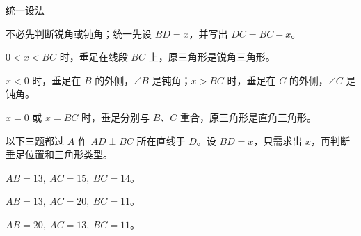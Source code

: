 \documentclass{exam-zh}
\begin{document}
\begin{eduSummaryBlock}{\eduIconPin}{统一设法}
\begin{eduBulletList}
  \item 不必先判断锐角或钝角；统一先设 $BD=x$，并写出 $DC=BC-x$。
  \item $0<x<BC$ 时，垂足在线段 $BC$ 上，原三角形是锐角三角形。
  \item $x<0$ 时，垂足在 $B$ 的外侧，$\angle B$ 是钝角；$x>BC$ 时，垂足在 $C$ 的外侧，$\angle C$ 是钝角。
  \item $x=0$ 或 $x=BC$ 时，垂足分别与 $B$、$C$ 重合，原三角形是直角三角形。
\end{eduBulletList}
以下三题都过 $A$ 作 $AD\perp BC$ 所在直线于 $D$。设 $BD=x$，只需求出 $x$，再判断垂足位置和三角形类型。
\begin{eduBulletList}
  \item $AB=13,\ AC=15,\ BC=14$。
  \item $AB=13,\ AC=20,\ BC=11$。
  \item $AB=20,\ AC=13,\ BC=11$。
\end{eduBulletList}
\end{eduSummaryBlock}
\end{document}
